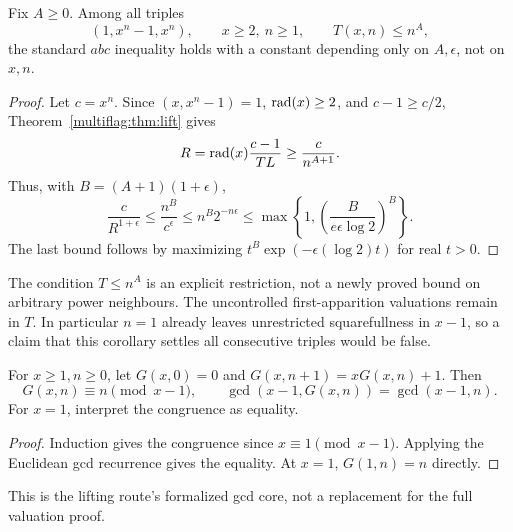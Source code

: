 \begin{corollary}\label{multiflag:cor:stratum}
Fix \(A\ge0\). Among all triples
\[
 (1,x^n-1,x^n),\qquad x\ge2,\ n\ge1,\qquad T(x,n)\le n^A,
\]
the standard \(abc\) inequality holds with a constant depending only on \(A,\epsilon\), not on \(x,n\).
\end{corollary}
\begin{proof}
Let \(c=x^n\). Since \((x,x^n-1)=1\), \(\operatorname{rad}(x)\ge2\), and \(c-1\ge c/2\), Theorem~\ref{multiflag:thm:lift} gives
\[
 R=\operatorname{rad}(x)\frac{c-1}{TL}\ge\frac{c}{n^{A+1}}.
\]
Thus, with \(B=(A+1)(1+\epsilon)\),
\[
 \frac{c}{R^{1+\epsilon}}\le\frac{n^B}{c^\epsilon}
 \le n^B2^{-n\epsilon}\le
 \max\left\{1,\left(\frac{B}{e\epsilon\log2}\right)^B\right\}.
\]
The last bound follows by maximizing \(t^B\exp(-\epsilon(\log2)t)\) for real \(t>0\).
\end{proof}
The condition \(T\le n^A\) is an explicit restriction, not a newly proved bound on arbitrary power neighbours. The uncontrolled first-apparition valuations remain in \(T\). In particular \(n=1\) already leaves unrestricted squarefullness in \(x-1\), so a claim that this corollary settles all consecutive triples would be false.

\begin{lemma}\label{multiflag:lem:gcd}
For \(x\ge1,n\ge0\), let \(G(x,0)=0\) and \(G(x,n+1)=xG(x,n)+1\). Then
\[
 G(x,n)\equiv n\pmod{x-1},\qquad
 \gcd(x-1,G(x,n))=\gcd(x-1,n).
\]
For \(x=1\), interpret the congruence as equality.
\end{lemma}
\begin{proof}
Induction gives the congruence since \(x\equiv1\pmod{x-1}\). Applying the Euclidean gcd recurrence gives the equality. At \(x=1\), \(G(1,n)=n\) directly.
\end{proof}
This is the lifting route's formalized gcd core, not a replacement for the full valuation proof.

